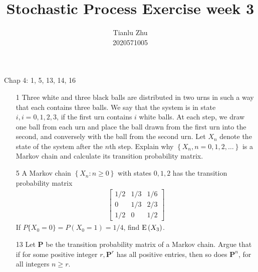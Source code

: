 \documentclass[en,hazy,blue,12pt,device = pad]{elegantnote}
\title{Stochastic Process Exercise week 3}
\author{Tianlu Zhu \\ 2020571005}
\date{}
\begin{document}
\maketitle
Chap 4: 1, 5, 13, 14, 16
\begin{enumerate}
    \item[1] Three white and three black balls are distributed in two urns in such a way that each contains three balls. We say that the system is in state \(i, i=0,1,2,3\), if the first urn contains \(i\) white balls. At each step, we draw one ball from each urn and place the ball drawn from the first urn into the second, and conversely with the ball from the second urn. Let \(X_n\) denote the state of the system after the \(n\)th step. Explain why \(\left\{X_n, n=0,1,2, \ldots\right\}\) is a Markov chain and calculate its transition probability matrix.
    
    \begin{tcolorbox}
        \sol 


    \end{tcolorbox}

    \item[5] A Markov chain \(\left\{X_n:n\geq 0 \right\}\) with states \(0,1,2\) has the transition probability matrix
    \begin{align*}
        \begin{bmatrix}
            1/2 & 1/3 & 1/6 \\
            0& 1/3 & 2/3\\
            1/2 & 0 &1/2
        \end{bmatrix}
    \end{align*}
    If \(P\{X_0 = 0\}= P(X_0 = 1) = 1/4\), find \(\operatorname E\left(X_3\right)\).

    \begin{tcolorbox}
        \sol


    \end{tcolorbox}

    \item[13]Let \(\mathbf{P}\) be the transition probability matrix of a Markov chain. Argue that if for some positive integer \(r, \mathbf{P}^r\) has all positive entries, then so does \(\mathbf{P}^n\), for all integers \(n \geqslant r\).
    
    \begin{tcolorbox}
        \sol


    \end{tcolorbox}


\end{enumerate}
\end{document}
